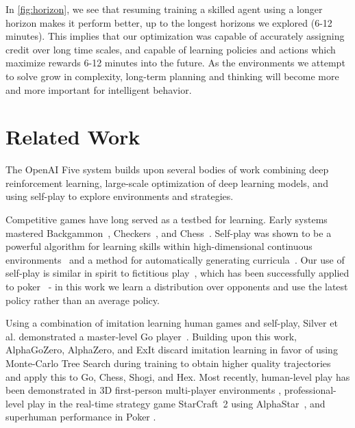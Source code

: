 \documentclass[11pt]{article}
\newcommand\nicetohave[1]{}
\newcommand{\openaifive}{OpenAI Five\xspace}
\begin{document}
In \autoref{fig:horizon}, we see that resuming training a skilled agent using a longer horizon makes it perform better, up to the longest horizons we explored (6-12 minutes). 
This implies that our optimization was capable of accurately assigning credit over long time scales, and capable of learning policies and actions which maximize rewards 6-12 minutes into the future.
As the environments we attempt to solve grow in complexity, long-term planning and thinking will become more and more important for intelligent behavior. 

\section{Related Work}
\nicetohave{discuss other families of algorithms, early q-learning attempts}
The \openaifive system builds upon several bodies of work combining deep reinforcement learning, large-scale optimization of deep learning models, and using self-play to explore environments and strategies.

Competitive games have long served as a testbed for learning. Early systems mastered Backgammon~\cite{tesauro1994td}, Checkers~\cite{SCHAEFFER1992273checkers}, and Chess~\cite{campbell2002deepblue}.
Self-play was shown to be a powerful algorithm for learning skills within high-dimensional continuous environments~\cite{bansal2017emergent} and a method for automatically generating curricula~\cite{sukhbaatar2017intrinsic}. 
Our use of self-play is similar in spirit to fictitious play~\cite{brown:fp1951}, which has been successfully applied to poker~\cite{DBLP:journals/corr/HeinrichS16} - in this work we learn a distribution over opponents and use the latest policy rather than an average policy.

Using a combination of imitation learning human games and self-play, Silver et al. demonstrated a master-level Go player~\cite{silver2016mastering}. 
Building upon this work, AlphaGoZero, AlphaZero, and ExIt discard imitation learning in favor of using Monte-Carlo Tree Search during training to obtain higher quality trajectories~\cite{silver2017mastering,anthony2017thinking,silver2018general} and apply this to Go, Chess, Shogi, and Hex. 
Most recently, human-level play has been demonstrated in 3D first-person multi-player environments \cite{jaderberg2018human}, professional-level play in the real-time strategy game StarCraft~2 using AlphaStar~\cite{alphastarblog}, and superhuman performance in Poker \cite{brown2019superhuman}.
\end{document}

